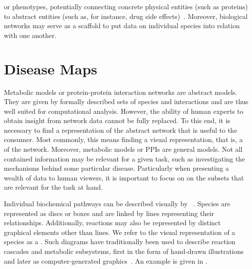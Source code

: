 \documentclass[
	fontsize=10pt, %
	twoside=true, %
	secnumdepth=1, %
  toc=indentunnumbered %
]{kaobook}
\begin{document}
or phenotypes, potentially connecting concrete physical entities (such as
proteins) to abstract entities (such as, for instance, drug side effects)~\cite{ruiz_identification_2021, barabasi_NetworkMedicineNetworkbased_2011}.
Moreover, biological networks
may serve as a scaffold to put data on individual species into relation with one
another.

\section{Disease Maps}


Metabolic models or protein-protein interaction networks are abstract models.
They are given by formally described sets of species and interactions and are
thus well suited for computational analysis. However, the ability of human
experts to obtain insight from network data cannot be fully replaced. To this
end, it is necessary to find a representation of the abstract network that is
useful to the consumer. Most commonly, this means finding a visual
representation, that is, a  of the network. Moreover, metabolic
models or PPIs are general models. Not all contained information may be relevant
for a given task, such as investigating the mechanisms behind some particular
disease. Particularly when presenting a wealth of data to human viewers, it is
important to focus on on the subsets that are relevant for the task at hand.

Individual biochemical pathways can be described visually by ~\cite{siebenhaller_HumanlikeLayoutAlgorithms_2020}.
Species are
represented as discs or boxes and are linked by lines representing their
relationships. Additionally, reactions may also be represented by distinct
graphical elements other than lines. We refer to the visual representation of a
species as a . Such diagrams have traditionally been used to
describe reaction cascades and metabolic subsystems, first in the form of
hand-drawn illustrations and later as computer-generated
graphics~\cite{becker_GraphLayoutAlgorithm_2001,paley_PathwayToolsCellular_2006,droste_SemiautomaticDrawingMetabolic_2012}. An example is given in .
\end{document}
